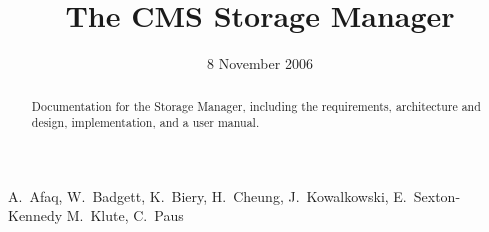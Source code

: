 \documentclass{cmspaper}
\begin{document}

\begin{titlepage}

   \date{8 November 2006}

  \title{The CMS Storage Manager}

  \begin{Authlist}
    A.~Afaq, W.~Badgett, K.~Biery, H.~Cheung, J.~Kowalkowski, 
    E.~Sexton-Kennedy
    M.~Klute, C.~Paus
  \end{Authlist}



  \begin{abstract}
    Documentation for the Storage Manager, including the requirements,
    architecture and design, implementation, and a user manual.
  \end{abstract} 

  
\end{titlepage}

\setcounter{page}{2}%

%
%
%
%
%  
%
\end{document}
